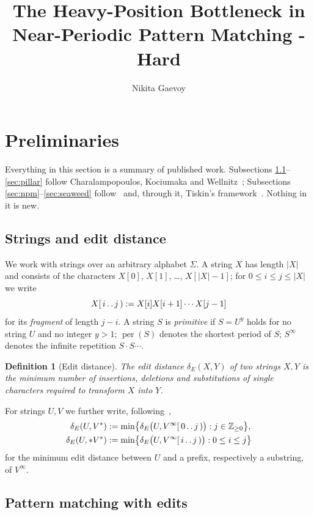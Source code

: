 \documentclass[10pt]{article}
\title{The Heavy-Position Bottleneck in Near-Periodic Pattern Matching - Hard}
\author{Nikita Gaevoy}
\date{}
\newtheorem{definition}{Definition}
\newcommand{\dE}{\delta_E}
\newcommand{\per}{\operatorname{per}}
\begin{document}
\maketitle

\section{Preliminaries}

Everything in this section is a summary of published work. Subsections
\ref{sec:strings}--\ref{sec:pillar} follow Charalampopoulos, Kociumaka and
Wellnitz~\cite{CKW20,CKW22}; Subsections
\ref{sec:npm}--\ref{sec:seaweed} follow~\cite{CKW22} and, through it,
Tiskin's framework~\cite{Tiskin08,Tiskin15,TiskinArXiv}. Nothing in it is new.

\subsection{Strings and edit distance}\label{sec:strings}

We work with strings over an arbitrary alphabet $\Sigma$. A string $X$ has
length $|X|$ and consists of the characters $X[0]$, $X[1]$, \ldots,
$X[|X|-1]$; for $0\le i\le j\le|X|$ we write
\[
X[\,i\mathinner{.\,.}j\,) := X[i]X[i+1]\cdots X[j-1]
\]
for its \emph{fragment} of length $j-i$. A string $S$ is \emph{primitive} if
$S=U^y$ holds for no string $U$ and no integer $y>1$; $\per(S)$ denotes the
shortest period of $S$; $S^\infty$ denotes the infinite repetition
$S\cdot S\cdots$.

\begin{definition}[Edit distance]
The \emph{edit distance} $\dE(X,Y)$ of two strings $X,Y$ is the minimum number
of insertions, deletions and substitutions of single characters required to
transform $X$ into $Y$.
\end{definition}

For strings $U,V$ we further write, following~\cite[Section 1.3]{CKW22},
\[
\begin{aligned}
\dE(U,V^*)&:=\min\bigl\{\dE\bigl(U,V^\infty[\,0\mathinner{.\,.}j\,)\bigr):j\in\mathbb{Z}_{\ge0}\bigr\},\\
\dE(U,{*}V^*)&:=\min\bigl\{\dE\bigl(U,V^\infty[\,i\mathinner{.\,.}j\,)\bigr):0\le i\le j\bigr\}
\end{aligned}
\]
for the minimum edit distance between $U$ and a prefix, respectively a
substring, of $V^\infty$.

\subsection{Pattern matching with edits}\label{sec:pmwe}
\end{document}
